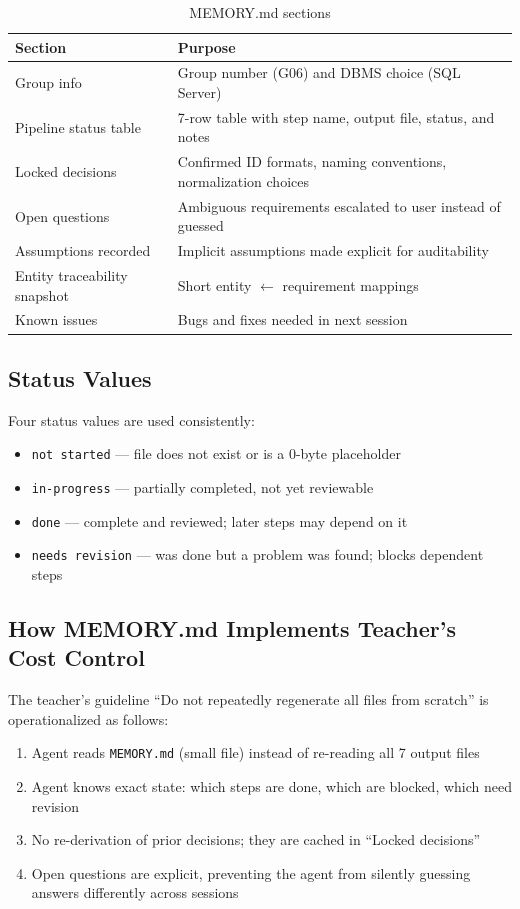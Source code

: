 \documentclass[12pt,a4paper]{article}
\begin{document}
\begin{table}[h]
\centering
\begin{tabular}{|l|p{7cm}|}
\hline
\textbf{Section} & \textbf{Purpose} \\
\hline
Group info & Group number (G06) and DBMS choice (SQL Server) \\
\hline
Pipeline status table & 7-row table with step name, output file, status, and notes \\
\hline
Locked decisions & Confirmed ID formats, naming conventions, normalization choices \\
\hline
Open questions & Ambiguous requirements escalated to user instead of guessed \\
\hline
Assumptions recorded & Implicit assumptions made explicit for auditability \\
\hline
Entity traceability snapshot & Short entity $\leftarrow$ requirement mappings \\
\hline
Known issues & Bugs and fixes needed in next session \\
\hline
\end{tabular}
\caption{MEMORY.md sections}
\end{table}

\subsection{Status Values}

Four status values are used consistently:
\begin{itemize}[nosep]
    \item \texttt{not started} --- file does not exist or is a 0-byte placeholder
    \item \texttt{in-progress} --- partially completed, not yet reviewable
    \item \texttt{done} --- complete and reviewed; later steps may depend on it
    \item \texttt{needs revision} --- was done but a problem was found; blocks dependent steps
\end{itemize}

\subsection{How MEMORY.md Implements Teacher's Cost Control}

The teacher's guideline ``Do not repeatedly regenerate all files from scratch'' is operationalized as follows:

\begin{enumerate}
    \item Agent reads \texttt{MEMORY.md} (small file) instead of re-reading all 7 output files
    \item Agent knows exact state: which steps are done, which are blocked, which need revision
    \item No re-derivation of prior decisions; they are cached in ``Locked decisions''
    \item Open questions are explicit, preventing the agent from silently guessing answers differently across sessions
\end{enumerate}
\end{document}
